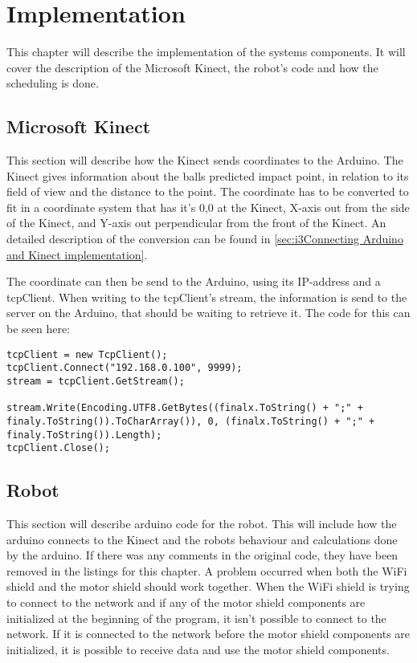 \chapter{Implementation}
\label{chap:Implementation}
This chapter will describe the implementation of the systems components. It will cover the description of the Microsoft Kinect, the robot's code and how the scheduling is done. 

\section{Microsoft Kinect}
\label{sec:Microsoft Kinect Implementation}
This section will describe how the Kinect sends coordinates to the Arduino.
The Kinect gives information about the balls predicted impact point, in relation to its field of view and the distance to the point. The coordinate has to be converted to fit in a coordinate system that has it’s 0,0 at the Kinect, X-axis out from the side of the Kinect, and Y-axis out perpendicular from the front of the Kinect.
An detailed description of the conversion can be found in \ref{sec:i3Connecting Arduino and Kinect implementation}.

The coordinate can then be send to the Arduino, using its IP-address and a tcpClient. 
When writing to the tcpClient’s stream, the information is send to the server on the Arduino, that should be waiting to retrieve it.
The code for this can be seen here:

\begin{lstlisting}[caption={Sending data to the Arduino}, label={sendData}]
tcpClient = new TcpClient();
tcpClient.Connect("192.168.0.100", 9999);
stream = tcpClient.GetStream();

stream.Write(Encoding.UTF8.GetBytes((finalx.ToString() + ";" + finaly.ToString()).ToCharArray()), 0, (finalx.ToString() + ";" + finaly.ToString()).Length);
tcpClient.Close();
\end{lstlisting}


\section{Robot}
\label{sec:Robot}
This section will describe arduino code for the robot. This will include how the arduino connects to the Kinect and the robots behaviour and calculations done by the arduino. If there was any comments in the original code, they have been removed in the listings for this chapter. \newline
A problem occurred when both the WiFi shield and the motor shield should work together. When the WiFi shield is trying to connect to the network and if any of the motor shield components are initialized at the beginning of the program, it isn't possible to connect to the network. If it is connected to the network before the motor shield components are initialized, it is possible to receive data and use the motor shield components.

